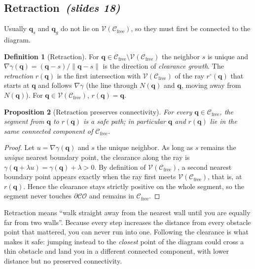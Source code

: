 \documentclass[11pt,a4paper]{article}
\newcommand{\Cfree}{\mathcal{C}_{\mathrm{free}}}
\newcommand{\CO}{\mathcal{CO}}
\newcommand{\Vor}{\mathcal{V}}
\newcommand{\vq}{\boldsymbol{q}}
\newcommand{\qs}{\boldsymbol{q}_s}
\newcommand{\qg}{\boldsymbol{q}_g}
\newcommand{\slides}[1]{\emph{(slides #1)}}
\newcommand{\subsect}[2]{\subsection{#1\texorpdfstring{\ \slides{#2}}{ (slides #2)}}}
\theoremstyle{definition}
\newtheorem{definition}{Definition}[section]
\theoremstyle{plain}
\newtheorem{proposition}[definition]{Proposition}
\theoremstyle{remark}
\begin{document}
\subsect{Retraction}{18}

Usually $\qs$ and $\qg$ do not lie on $\Vor(\Cfree)$, so they must first be connected to the diagram.

\begin{definition}[Retraction]
For $\vq\in\Cfree\setminus\Vor(\Cfree)$ the neighbor $s$ is unique and $\nabla\gamma(\vq)=(\vq-s)/\|\vq-s\|$ is the direction of \emph{clearance growth}. The \emph{retraction} $r(\vq)$ is the first intersection with $\Vor(\Cfree)$ of the ray $r^\circ(\vq)$ that starts at $\vq$ and follows $\nabla\gamma$ (the line through $N(\vq)$ and $\vq$, moving away from $N(\vq)$). For $\vq\in\Vor(\Cfree)$, $r(\vq)=\vq$.
\end{definition}

\begin{proposition}[Retraction preserves connectivity]
\label{prop:retr}
For every $\vq\in\Cfree$, the segment from $\vq$ to $r(\vq)$ is a safe path; in particular $\vq$ and $r(\vq)$ lie in the same connected component of $\Cfree$.
\end{proposition}
\begin{proof}
Let $u=\nabla\gamma(\vq)$ and $s$ the unique neighbor. As long as $s$ remains the \emph{unique} nearest boundary point, the clearance along the ray is $\gamma(\vq+\lambda u)=\gamma(\vq)+\lambda>0$. By definition of $\Vor(\Cfree)$, a second nearest boundary point appears exactly when the ray first meets $\Vor(\Cfree)$, that is, at $r(\vq)$. Hence the clearance stays strictly positive on the whole segment, so the segment never touches $\partial\CO$ and remains in $\Cfree$.
\end{proof}

\begin{intuition}
Retraction means ``walk straight away from the nearest wall until you are equally far from two walls''. Because every step increases the distance from every obstacle point that mattered, you can never run into one. Following the clearance is what makes it safe: jumping instead to the \emph{closest} point of the diagram could cross a thin obstacle and land you in a different connected component, with lower distance but no preserved connectivity.
\end{intuition}
\end{document}
